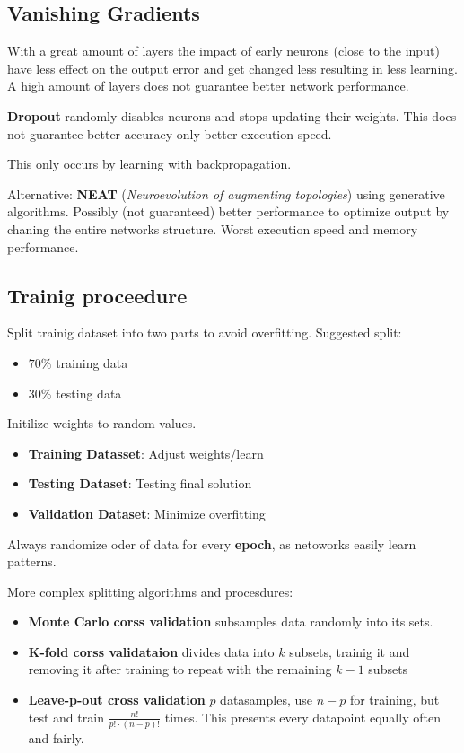 \documentclass[
    fontsize      = 11pt,
    paper         = a4,
    twoside       = false,
    parskip       = half,
    pagesize      = false,
]{scrartcl}
\providecommand{\tightlist}{%
  \setlength{\itemsep}{0pt}\setlength{\parskip}{0pt}}
\begin{document}
\hypertarget{vanishing-gradients}{%
\subsection{Vanishing Gradients}\label{vanishing-gradients}}

With a great amount of layers the impact of early neurons (close to the
input) have less effect on the output error and get changed less
resulting in less learning. A high amount of layers does not guarantee
better network performance.

\textbf{Dropout} randomly disables neurons and stops updating their
weights. This does not guarantee better accuracy only better execution
speed.

This only occurs by learning with backpropagation.

Alternative: \textbf{NEAT} (\emph{Neuroevolution of augmenting
topologies}) using generative algorithms. Possibly (not guaranteed)
better performance to optimize output by chaning the entire networks
structure. Worst execution speed and memory performance.

\hypertarget{trainig-proceedure}{%
\subsection{Trainig proceedure}\label{trainig-proceedure}}

Split trainig dataset into two parts to avoid overfitting. Suggested
split:

\begin{itemize}
\tightlist
\item
  \(70\%\) training data
\item
  \(30\%\) testing data
\end{itemize}

Initilize weights to random values.

\begin{itemize}
\tightlist
\item
  \textbf{Training Datasset}: Adjust weights/learn
\item
  \textbf{Testing Dataset}: Testing final solution
\item
  \textbf{Validation Dataset}: Minimize overfitting
\end{itemize}

Always randomize oder of data for every \textbf{epoch}, as netoworks
easily learn patterns.

More complex splitting algorithms and procesdures:

\begin{itemize}
\tightlist
\item
  \textbf{Monte Carlo corss validation} subsamples data randomly into
  its sets.
\item
  \textbf{K-fold corss validataion} divides data into \(k\) subsets,
  trainig it and removing it after training to repeat with the remaining
  \(k-1\) subsets
\item
  \textbf{Leave-p-out cross validation} \(p\) datasamples, use \(n-p\)
  for training, but test and train \(\frac{n!}{p!\cdot (n-p)!}\) times.
  This presents every datapoint equally often and fairly.
\end{itemize}
\end{document}
